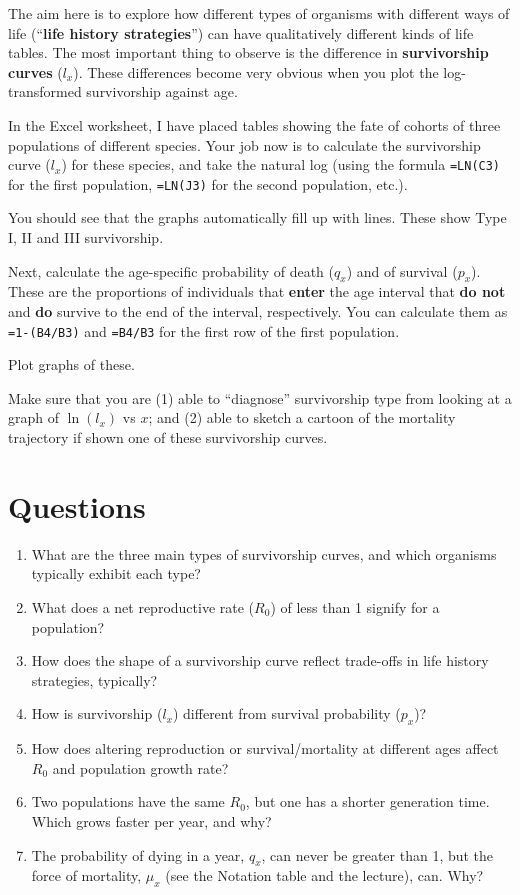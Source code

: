 \documentclass[
  a4paper]{book}
\begin{document}
The aim here is to explore how different types of organisms with different ways of life (``\textbf{life history strategies}'') can have qualitatively different kinds of life tables. The most important thing to observe is the difference in \textbf{survivorship curves} (\(l_x\)). These differences become very obvious when you plot the log-transformed survivorship against age.

In the Excel worksheet, I have placed tables showing the fate of cohorts of three populations of different species. Your job now is to calculate the survivorship curve (\(l_x\)) for these species, and take the natural log (using the formula \texttt{=LN(C3)} for the first population, \texttt{=LN(J3)} for the second population, etc.).

You should see that the graphs automatically fill up with lines. These show Type I, II and III survivorship.

Next, calculate the age-specific probability of death (\(q_x\)) and of survival (\(p_x\)). These are the proportions of individuals that \textbf{enter} the age interval that \textbf{do not} and \textbf{do} survive to the end of the interval, respectively. You can calculate them as \texttt{=1-(B4/B3)} and \texttt{=B4/B3} for the first row of the first population.

Plot graphs of these.

Make sure that you are (1) able to ``diagnose'' survivorship type from looking at a graph of \(\ln(l_x)\) vs \(x\); and (2) able to sketch a cartoon of the mortality trajectory if shown one of these survivorship curves.

\section{Questions}\label{questions-7}

\begin{enumerate}
\def\labelenumi{\arabic{enumi}.}
\item
  What are the three main types of survivorship curves, and which organisms typically exhibit each type?
\item
  What does a net reproductive rate (\(R_0\)) of less than 1 signify for a population?
\item
  How does the shape of a survivorship curve reflect trade-offs in life history strategies, typically?
\item
  How is survivorship (\(l_x\)) different from survival probability (\(p_x\))?
\item
  How does altering reproduction or survival/mortality at different ages affect \(R_0\) and population growth rate?
\item
  Two populations have the same \(R_0\), but one has a shorter generation time. Which grows faster per year, and why?
\item
  The probability of dying in a year, \(q_x\), can never be greater than 1, but the force of mortality, \(\mu_x\) (see the Notation table and the lecture), can. Why?
\end{enumerate}
\end{document}
